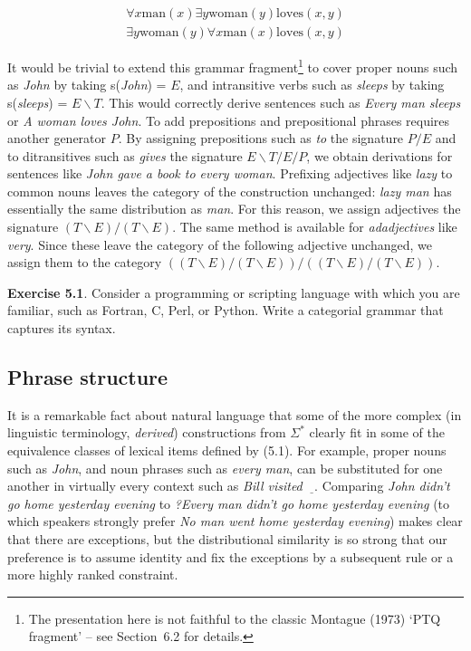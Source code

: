 \begin{eqnarray}
\forall x \mbox{man}(x) \exists y \mbox{woman}(y) \mbox{loves}(x,y)\\
\exists y \mbox{woman}(y) \forall x \mbox{man}(x) \mbox{loves}(x,y)
\end{eqnarray}

\noindent 

It would be trivial to extend this grammar fragment\footnote{The presentation
  here is not faithful to the classic Montague (1973) `PTQ fragment' -- see
  Section~6.2 for details.} to cover proper nouns such as {\it John} by taking
s({\it John}) = $E$, and intransitive verbs such as {\it sleeps} by taking
s({\it sleeps}) = $E \backslash T$. This would correctly derive sentences such
as {\it Every man sleeps} or {\it A woman loves John}.  To add prepositions
and prepositional phrases requires another generator $P$. By assigning
prepositions such as {\it to} the signature $P/E$ and to ditransitives such as
{\it gives} the signature $E \backslash T/E/P$, we obtain derivations for
sentences like {\it John gave a book to every woman}.  Prefixing adjectives
like {\it lazy} to common nouns leaves the category of the construction
unchanged: {\it lazy man} has essentially the same distribution as {\it man}.
For this reason, we assign adjectives the signature $(T \backslash E)/(T
\backslash E)$. The same method is available for {\it adadjectives} like {\it
  very}. Since these leave the category of the following adjective unchanged,
we assign them to the category $((T \backslash E)/(T \backslash E))/((T
\backslash E)/(T \backslash E))$.   

\smallskip
\noindent
{\bf Exercise 5.1}. Consider a programming or scripting language with which
you are familiar, such as Fortran, C, Perl, or Python. Write a categorial
grammar that captures its syntax.

\subsection{Phrase structure}

It is a remarkable fact about natural language that some of the more complex
(in linguistic terminology, {\it derived}) constructions from $\Sigma^*$
clearly fit in some of the equivalence classes of lexical items defined by
(5.1).  For example, proper nouns such as {\it John}, and noun phrases such as
{\it every man}, can be substituted for one another in virtually every context
such as {\it Bill visited~$\underline{\ \ }$}. Comparing {\it John didn't go
  home yesterday evening} to {\it ?Every man didn't go home yesterday evening}
(to which speakers strongly prefer {\it No man went home yesterday evening})
makes clear that there are exceptions, but the distributional similarity is so
strong that our preference is to assume identity and fix the exceptions by a
subsequent rule or a more highly ranked constraint.

